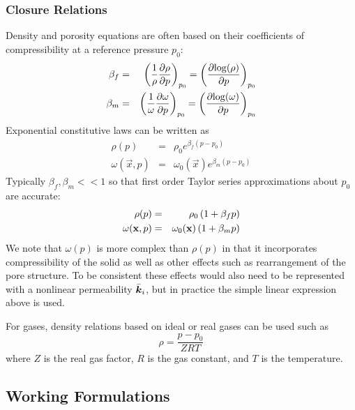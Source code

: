 \documentclass[10pt,dvips,twoside,reqno]{amsart}
\begin{document}
\subsubsection{Closure Relations}

Density and porosity equations are often based on their coefficients
of compressibility at a reference pressure $p_0$:
\begin{eqnarray}
  \label{eq:compressibility}
  \beta_f &=& \left( \frac{1}{\rho}\frac{\partial {\rho}}{\partial {p}}\right)_{p_0} = \left( \frac{\partial {\log(\rho)}}{\partial {p}} \right)_{p_0} \\
  \beta_m &=& \left( \frac{1}{\omega}\frac{\partial {\omega}}{\partial {p}}\right)_{p_0} = \left( \frac{\partial {\log(\omega)}}{\partial {p}} \right)_{p_0}
\end{eqnarray}
Exponential constitutive laws can be written as
\begin{eqnarray}
\label{eq:expDensity}
\rho(p) &=& \rho_0 e^{\beta_f(p - p_0)} \\
\label{eq:expPorosity}
\omega(\vec x, p) &=& \omega_0(\vec x) e^{\beta_m (p - p_0)} 
\end{eqnarray}
Typically $\beta_f,\beta_m << 1$ so that first order Taylor
series approximations about $p_0$ are accurate:
\begin{eqnarray}
\label{eq:linearDensity}
\rho(p) &=& \rho_0 \left( 1 + \beta_f p \right) \\
\label{eq:linearPorosity}
\omega({\bf x},p) &=& \omega_0({\bf x}) \left( 1 + \beta_m p \right) 
\end{eqnarray}
We note that $\omega(p)$ is more complex than $\rho(p)$ in that it
incorporates compressibility of the solid as well as other effects
such as rearrangement of the pore structure. To be consistent these
effects would also need to be represented with a nonlinear
permeability $\bar{\mbox{{\boldmath ${k}$}}}_i$, but in practice the simple linear expression
above is used.

For gases, density relations based on ideal or real gases can be used
such as \citep{Helmig_97}
\begin{equation}
  \label{eq:gasDensity}
  \rho = \frac{p-p_0}{Z R T}
\end{equation}
where $Z$ is the real gas factor, $R$ is the gas constant, and $T$ is
the temperature.

\subsection{Working Formulations}
\end{document}
